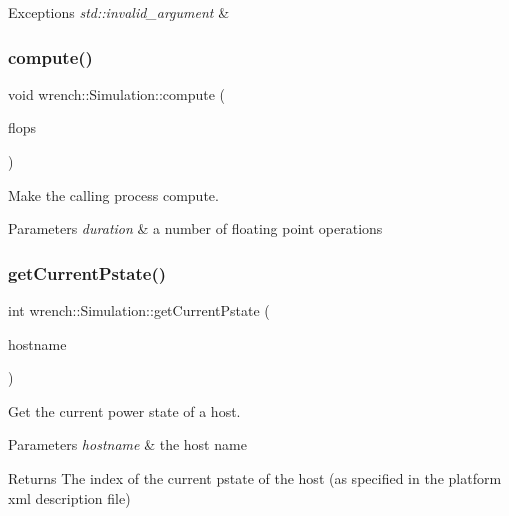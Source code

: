 \begin{DoxyExceptions}{Exceptions}
{\em std\+::invalid\+\_\+argument} & \\
\hline
\end{DoxyExceptions}
\mbox{\label{classwrench_1_1_simulation_a26092a37ea422703f0880748844cf820}} 
\subsubsection{\texorpdfstring{compute()}{compute()}}
{\footnotesize\ttfamily void wrench\+::\+Simulation\+::compute (\begin{DoxyParamCaption}\item[{double}]{flops }\end{DoxyParamCaption})\hspace{0.3cm}{\ttfamily [static]}}



Make the calling process compute. 


\begin{DoxyParams}{Parameters}
{\em duration} & a number of floating point operations \\
\hline
\end{DoxyParams}
\mbox{\label{classwrench_1_1_simulation_a3d204b229feec1eee4f1e82d92490d81}} 
\subsubsection{\texorpdfstring{get\+Current\+Pstate()}{getCurrentPstate()}}
{\footnotesize\ttfamily int wrench\+::\+Simulation\+::get\+Current\+Pstate (\begin{DoxyParamCaption}\item[{const std\+::string \&}]{hostname }\end{DoxyParamCaption})\hspace{0.3cm}{\ttfamily [static]}}



Get the current power state of a host. 


\begin{DoxyParams}{Parameters}
{\em hostname} & the host name \\
\hline
\end{DoxyParams}
\begin{DoxyReturn}{Returns}
The index of the current pstate of the host (as specified in the platform xml description file) 
\end{DoxyReturn}
\mbox{\label{classwrench_1_1_simulation_a9721ec8f4c31dcb6bdb032c9ba08f815}} 
